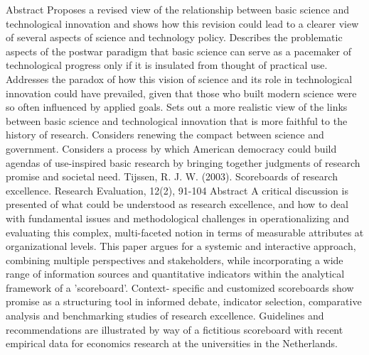 \documentclass[a4paper,11pt]{article}
\begin{document}
Abstract
Proposes a revised view of the relationship between basic science and technological innovation and shows how this revision could lead to a clearer view of several aspects of science and technology policy. Describes the problematic aspects of the postwar paradigm that basic science can serve as a pacemaker of technological progress only if it is insulated from thought of practical use.
Addresses the paradox of how this vision of science and its role in
technological innovation could have prevailed, given that those who
built modern science were so often influenced by applied goals. Sets
out a more realistic view of the links between basic science and
technological innovation that is more faithful to the history of
research. Considers renewing the compact between science and
government. Considers a process by which American democracy could
build agendas of use-inspired basic research by bringing together judgments of research promise and societal need.
Tijssen, R. J. W. (2003). Scoreboards of research excellence. Research Evaluation, 12(2), 91-104
Abstract
A critical discussion is presented of what could be understood as research excellence, and how to deal with fundamental issues and methodological challenges in operationalizing and evaluating this complex, multi-faceted notion in terms of measurable attributes at organizational levels. This paper argues for a systemic and interactive approach, combining multiple perspectives and stakeholders, while incorporating a wide range of information sources and quantitative indicators within the analytical framework of a 'scoreboard'. Context- specific and customized scoreboards show promise as a structuring tool in informed debate, indicator selection, comparative analysis and benchmarking studies of research excellence. Guidelines and recommendations are illustrated by way of a fictitious scoreboard with recent empirical data for economics research at the universities in the Netherlands.





\end{document}
